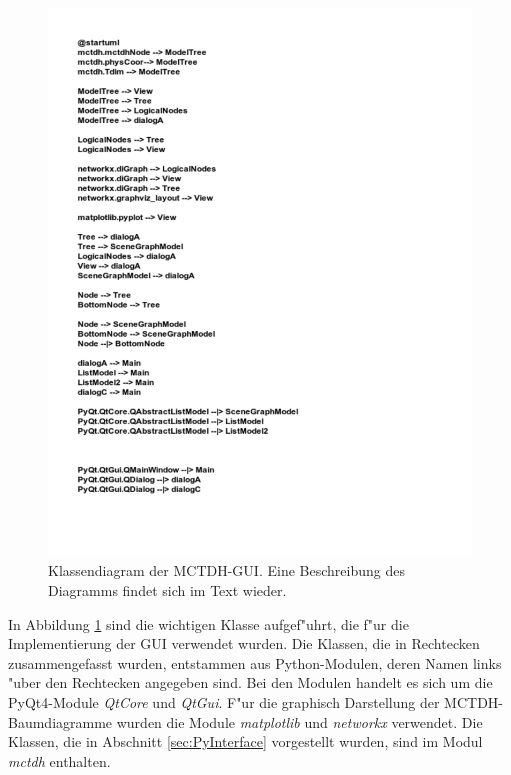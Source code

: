  \begin{figure}
    \centering
    \vspace*{-0.5cm}\includegraphics[width=\textwidth, angle=90, scale=1.4]{figures/umlPyQt}
    \caption{Klassendiagram der MCTDH-GUI. Eine Beschreibung des Diagramms
     findet sich im Text wieder.}\label{fig:uml_PyQt}
\end{figure}

In Abbildung \ref{fig:uml_PyQt} sind die wichtigen Klasse aufgef"uhrt, die f"ur die Implementierung der GUI verwendet wurden. 
Die Klassen, die in Rechtecken zusammengefasst wurden, entstammen aus Python-Modulen, deren Namen links "uber den Rechtecken angegeben sind.
Bei den Modulen handelt es sich um die PyQt4-Module \textit{QtCore} und \textit{QtGui}. F"ur die graphisch Darstellung der MCTDH-Baumdiagramme
wurden die Module \textit{matplotlib} und \textit{networkx} verwendet. Die Klassen, die in Abschnitt \ref{sec:PyInterface} vorgestellt wurden,
sind im Modul \textit{mctdh} enthalten. 

